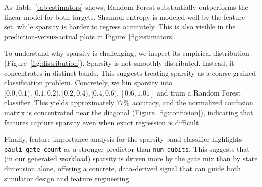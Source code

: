 

As Table~\ref{tab:estimators} shows, Random Forest substantially outperforms the
linear model for both targets. Shannon entropy is modeled well by the feature
set, while sparsity is harder to regress accurately. This is also visible in the
prediction-versus-actual plots in Figure~\ref{fig:estimators}.

To understand why sparsity is challenging, we inspect its empirical distribution
(Figure~\ref{fig:distribution}). Sparsity is not smoothly distributed. Instead,
it concentrates in distinct bands. This suggests treating sparsity as a
coarse-grained classification problem. Concretely, we bin sparsity into
$[0.0,0.1),[0.1,0.2),[0.2,0.4),[0.4,0.6),[0.6,1.01]$ and train a Random Forest
classifier. This yields approximately $77\%$ accuracy, and the normalized confusion matrix
is concentrated near the diagonal (Figure~\ref{fig:confusion}), indicating that
\sys features capture sparsity  even when exact regression
is difficult.

Finally, feature-importance analysis for the sparsity-band classifier highlights
\texttt{pauli\_gate\_count} as a stronger predictor than \texttt{num\_qubits}.
This suggests that (in our generated workload) sparsity is driven more by the
gate mix than by state dimension alone, offering a concrete, data-derived signal
that can guide both simulator design and feature engineering.



\medskip
  \vspace{0.2cm}
\noindent
\setlength{\fboxsep}{6pt}
%
  \vspace{0.2cm}

  





